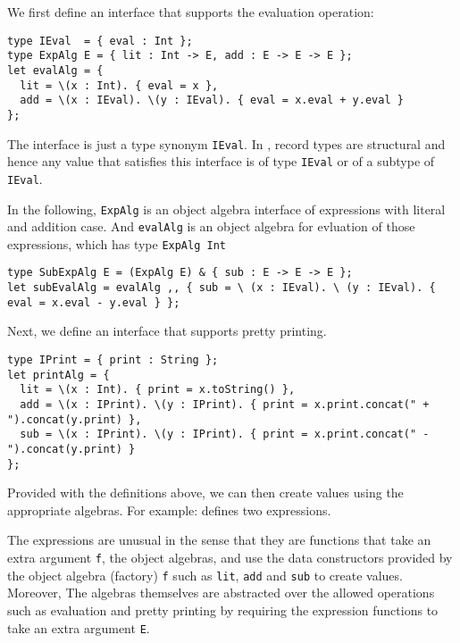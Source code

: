 We first define an interface that supports the evaluation operation:

\begin{verbatim}
type IEval  = { eval : Int };
type ExpAlg E = { lit : Int -> E, add : E -> E -> E };
let evalAlg = {
  lit = \(x : Int). { eval = x },
  add = \(x : IEval). \(y : IEval). { eval = x.eval + y.eval }
};
\end{verbatim}





The interface is just a type synonym \lstinline{IEval}. In \systemFI, record
types are structural and hence any value that satisfies this interface is of
type \lstinline{IEval} or of a subtype of \lstinline{IEval}.

In the following, \lstinline{ExpAlg} is an object algebra interface of
expressions with literal and addition case. And \lstinline{evalAlg} is an object
algebra for evluation of those expressions, which has type \lstinline{ExpAlg Int}

\begin{verbatim}
type SubExpAlg E = (ExpAlg E) & { sub : E -> E -> E };
let subEvalAlg = evalAlg ,, { sub = \ (x : IEval). \ (y : IEval). { eval = x.eval - y.eval } };
\end{verbatim}





Next, we define an interface that supports pretty printing.

\begin{verbatim}
type IPrint = { print : String };
let printAlg = {
  lit = \(x : Int). { print = x.toString() },
  add = \(x : IPrint). \(y : IPrint). { print = x.print.concat(" + ").concat(y.print) },
  sub = \(x : IPrint). \(y : IPrint). { print = x.print.concat(" - ").concat(y.print) }
};
\end{verbatim}





Provided with the definitions above, we can then create values using the
appropriate algebras. For example:
defines two expressions.

The expressions are unusual in the sense that they are functions that take an
extra argument \lstinline{f}, the object algebras, and use the data constructors
provided by the object algebra (factory) \lstinline{f} such as \lstinline{lit},
\lstinline{add} and \lstinline{sub} to create values. Moreover, The algebras
themselves are abstracted over the allowed operations such as evaluation and
pretty printing by requiring the expression functions to take an extra argument
\lstinline{E}.

